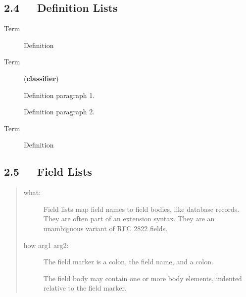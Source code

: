 \documentclass[10pt,a4paper,english]{article}
\begin{document}

\hypertarget{definition-lists}{}
\subsection*{2.4~~~Definition Lists}
\begin{description}
\item[Term]

Definition

\item[Term]
(\textbf{classifier})

Definition paragraph 1.

Definition paragraph 2.

\item[Term]

Definition

\end{description}



\hypertarget{field-lists}{}
\subsection*{2.5~~~Field Lists}
\begin{quote}
\begin{description}
\item [what:]
Field lists map field names to field bodies, like database
records.  They are often part of an extension syntax.  They are
an unambiguous variant of RFC 2822 fields.


\item [how arg1 arg2:]
The field marker is a colon, the field name, and a colon.

The field body may contain one or more body elements, indented
relative to the field marker.


\end{description}
\end{quote}
\end{document}
